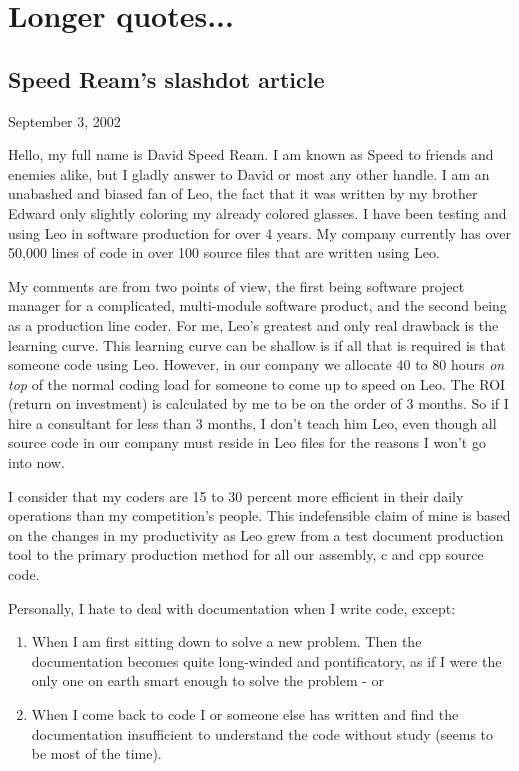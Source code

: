 \documentclass[a4paper,10pt,english]{sphinxmanual}
\begin{document}
\section{Longer quotes...}
\label{testimonials:longer-quotes}

\subsection{Speed Ream's slashdot article}
\label{testimonials:speed-ream-s-slashdot-article}
September 3, 2002

Hello, my full name is David Speed Ream. I am known as Speed to friends and
enemies alike, but I gladly answer to David or most any other handle. I am an
unabashed and biased fan of Leo, the fact that it was written by my brother
Edward only slightly coloring my already colored glasses. I have been testing
and using Leo in software production for over 4 years. My company currently has
over 50,000 lines of code in over 100 source files that are written using Leo.

My comments are from two points of view, the first being software project
manager for a complicated, multi-module software product, and the second being
as a production line coder. For me, Leo’s greatest and only real drawback is the
learning curve. This learning curve can be shallow is if all that is required is
that someone code using Leo. However, in our company we allocate 40 to 80 hours
\emph{on top} of the normal coding load for someone to come up to speed on Leo. The
ROI (return on investment) is calculated by me to be on the order of 3 months.
So if I hire a consultant for less than 3 months, I don’t teach him Leo, even
though all source code in our company must reside in Leo files for the reasons I
won’t go into now.

I consider that my coders are 15 to 30 percent more efficient in their daily
operations than my competition’s people. This indefensible claim of mine is
based on the changes in my productivity as Leo grew from a test document
production tool to the primary production method for all our assembly, c and cpp
source code.

Personally, I hate to deal with documentation when I write code, except:
\begin{enumerate}
\item {} 
When I am first sitting down to solve a new problem.
Then the documentation becomes quite long-winded and pontificatory,
as if I were the only one on earth smart enough to solve the problem - or

\item {} 
When I come back to code I or someone else has written and find the documentation insufficient to
understand the code without study (seems to be most of the time).

\end{enumerate}
\end{document}
